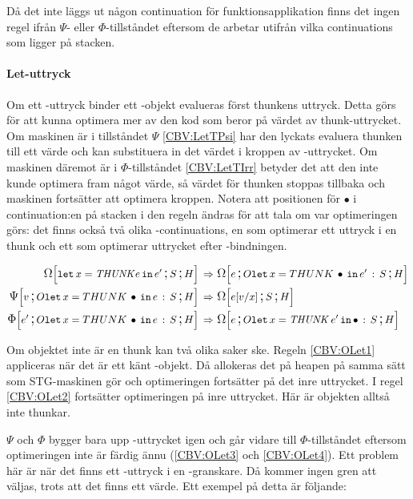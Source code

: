 \documentclass[../Optimise]{subfiles}
\begin{document}
Då det inte läggs ut någon continuation för funktionsapplikation finns det ingen regel
ifrån $\Psi$- eller $\Phi$-tillståndet eftersom de arbetar utifrån vilka continuations
som ligger på stacken.



\paragraph{Let-uttryck}

Om ett -uttryck binder ett -objekt evalueras först thunkens uttryck. 
Detta görs för att kunna optimera mer av den kod som beror på värdet av thunk-uttrycket. Om
maskinen är i tillståndet $\Psi$ \eqref{CBV:LetTPsi} har den lyckats evaluera thunken till ett värde och kan
substituera in det värdet i kroppen av -uttrycket. Om maskinen däremot är i $\Phi$-tillståndet
\eqref{CBV:LetTIrr} betyder det att den inte kunde optimera fram något värde,
så värdet för thunken stoppas tillbaka och maskinen fortsätter att
optimera kroppen. Notera att positionen för $\bullet$ i continuation:en på stacken
i den regeln ändras för att tala om var optimeringen görs: det finns också två olika
-continuations, en som optimerar ett uttryck i en thunk och ett som optimerar
uttrycket efter -bindningen.

\begin{align}
\label{CBV:LetTOmg} \OMEGA SH{\eLet x{\mobj{THUNK} e}{e'}}  \rulesep &\, \OMEGA{\oLet x{e'}S}He\\
\label{CBV:LetTPsi} \PSI{\oLet xeS}Hv  \rulesep &\, \OMEGA SH{e[v/x]} \\
\label{CBV:LetTIrr} \IRR{\oLet xeS}H{e'}  \rulesep &\, \OMEGA{\oLetObj x{\THUNK{e'}}S}He
\end{align}

Om objektet inte är en thunk kan två olika saker ske. Regeln \eqref{CBV:OLet1} appliceras när det är 
ett känt -objekt. Då allokeras det på heapen på samma sätt som STG-maskinen gör
och optimeringen fortsätter på det inre uttrycket. I regel \eqref{CBV:OLet2} 
fortsätter optimeringen på inre uttrycket. Här är objekten alltså
inte thunkar.

$\Psi$ och $\Phi$ bygger bara upp -uttrycket igen och går vidare till $\Phi$-tillståndet
eftersom optimeringen inte är färdig ännu (\eqref{CBV:OLet3} och \eqref{CBV:OLet4}). 
Ett problem här är när det finns ett -uttryck
i en -granskare. Då kommer ingen gren att väljas, trots att det finns ett värde. Ett
exempel på detta är följande:
\end{document}
